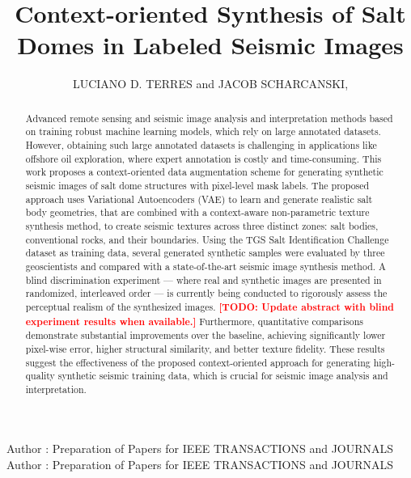 \documentclass{ieeeaccess}
\begin{document}

\title{Context-oriented Synthesis of Salt Domes in Labeled Seismic Images}
\author{\uppercase{Luciano D. Terres} and
\uppercase{Jacob Scharcanski},  }

\address[1]{Institute of Informatics,
Federal University of Rio Grande do Sul, Porto Alegre, RS, Brasil, 91501-970 (e-mail: ldterres@inf.ufrgs.br; jacobs@inf.ufrgs.br)}

\markboth
{Author \headeretal: Preparation of Papers for IEEE TRANSACTIONS and JOURNALS}
{Author \headeretal: Preparation of Papers for IEEE TRANSACTIONS and JOURNALS}



\begin{abstract}
Advanced remote sensing and seismic image analysis and interpretation methods based on training robust machine learning models, which rely on large annotated datasets. However, obtaining such large annotated datasets is challenging in applications like offshore oil exploration, where expert annotation is costly and time-consuming. This work proposes a context-oriented data augmentation scheme for generating synthetic seismic images of salt dome structures with pixel-level mask labels. The proposed approach uses Variational Autoencoders (VAE) to learn and generate realistic salt body geometries, that are combined with a context-aware non-parametric texture synthesis method, to create seismic textures across three distinct zones: salt bodies, conventional rocks, and their boundaries. Using the TGS Salt Identification Challenge dataset as training data,  several generated synthetic samples were evaluated by three geoscientists and compared with a state-of-the-art seismic image synthesis method. A blind discrimination experiment — where real and synthetic images are presented in randomized, interleaved order — is currently being conducted to rigorously assess the perceptual realism of the synthesized images. \textcolor{red}{\textbf{[TODO: Update abstract with blind experiment results when available.]}} Furthermore, quantitative comparisons demonstrate substantial improvements over the baseline, achieving significantly lower pixel-wise error, higher structural similarity, and better texture fidelity. These results suggest the effectiveness of the proposed context-oriented approach for generating high-quality synthetic seismic training data, which is crucial for seismic image analysis and interpretation.
\end{abstract}
\end{document}
